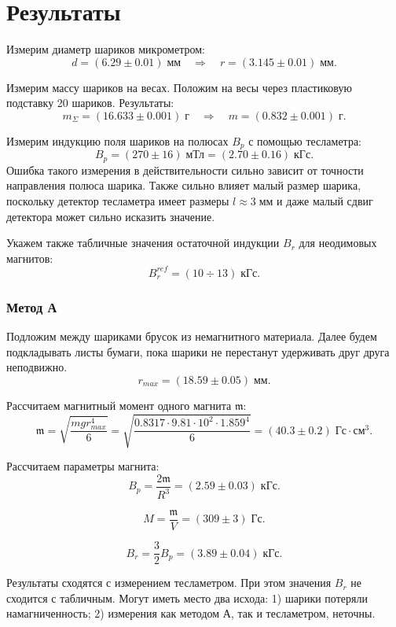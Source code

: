 \documentclass[12pt,a4paper]{article}
\begin{document}
	\section*{Результаты}
	
	Измерим диаметр шариков микрометром:
	$$ d = (6.29 \pm 0.01) \; \text{мм} \quad \Rightarrow \quad r = (3.145 \pm 0.01) \; \text{мм}. $$
	
	Измерим массу шариков на весах. Положим на весы через пластиковую подставку 20 шариков. Результаты:
	$$ m_\Sigma = (16.633 \pm 0.001) \; \text{г} \quad \Rightarrow \quad m = (0.832 \pm 0.001) \; \text{г}. $$
	
	Измерим индукцию поля шариков на полюсах $B_p$ с помощью тесламетра:
	$$ B_p = (270 \pm 16) \; \text{мТл} = (2.70 \pm 0.16) \; \text{кГс}. $$
	Ошибка такого измерения в действительности сильно зависит от точности направления полюса шарика. Также сильно влияет малый размер шарика, поскольку детектор тесламетра имеет размеры $l \approx 3 \; \text{мм}$ и даже малый сдвиг детектора может сильно исказить значение.
	
	Укажем также табличные значения остаточной индукции $B_r$ для неодимовых магнитов:
	$$ B_r^{ref} = (10 \div 13) \; \text{кГс}. $$
	
	\subsubsection*{Метод А}
	
	Подложим между шариками брусок из немагнитного материала. Далее будем подкладывать листы бумаги, пока шарики не перестанут удерживать друг друга неподвижно.
	$$ r_{max} = (18.59 \pm 0.05 ) \; \text{мм}. $$
	
	Рассчитаем магнитный момент одного магнита $\mathfrak{m}$:
	$$ \mathfrak{m} = \sqrt{\frac{mgr_{max}^4}{6}} = \sqrt{\frac{0.8317 \cdot 9.81 \cdot 10^2 \cdot 1.859^4}{6}} = (40.3 \pm 0.2) \; \text{Гс} \cdot \text{см}^3. $$
	
	Рассчитаем параметры магнита:
	$$ B_p = \frac{2\mathfrak{m}}{R^3} = (2.59 \pm 0.03) \; \text{кГс}. $$
	
	$$ M = \frac{\mathfrak{m}}{V} = (309 \pm 3) \; \text{Гс}. $$
	
	$$ B_r = \frac{3}{2} B_p = (3.89 \pm 0.04) \; \text{кГс}. $$
	
	Результаты сходятся с измерением тесламетром. При этом значения $B_r$ не сходится с табличным. Могут иметь место два исхода: 1) шарики потеряли намагниченность; 2) измерения как методом А, так и тесламетром, неточны.
	
\end{document}
